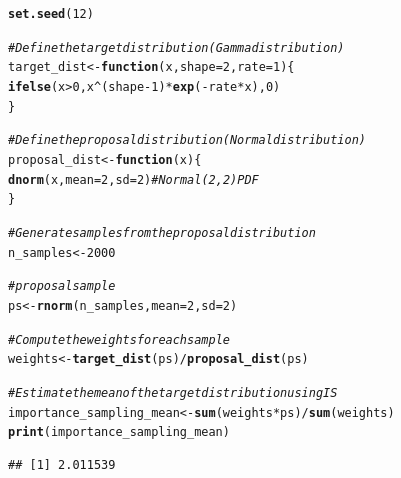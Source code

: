 \documentclass{article}\usepackage[]{graphicx}\usepackage[]{xcolor}
\makeatletter
\newcommand{\hlnum}[1]{\textcolor[rgb]{0.686,0.059,0.569}{#1}}%
\newcommand{\hlcom}[1]{\textcolor[rgb]{0.678,0.584,0.686}{\textit{#1}}}%
\newcommand{\hlopt}[1]{\textcolor[rgb]{0,0,0}{#1}}%
\newcommand{\hldef}[1]{\textcolor[rgb]{0.345,0.345,0.345}{#1}}%
\newcommand{\hlkwa}[1]{\textcolor[rgb]{0.161,0.373,0.58}{\textbf{#1}}}%
\newcommand{\hlkwb}[1]{\textcolor[rgb]{0.69,0.353,0.396}{#1}}%
\newcommand{\hlkwc}[1]{\textcolor[rgb]{0.333,0.667,0.333}{#1}}%
\newcommand{\hlkwd}[1]{\textcolor[rgb]{0.737,0.353,0.396}{\textbf{#1}}}%
\newenvironment{kframe}{%
 \def\at@end@of@kframe{}%
 \ifinner\ifhmode%
  \def\at@end@of@kframe{\end{minipage}}%
  \begin{minipage}{\columnwidth}%
 \fi\fi%
 \def\FrameCommand##1{\hskip\@totalleftmargin \hskip-\fboxsep
 \colorbox{shadecolor}{##1}\hskip-\fboxsep
     \hskip-\linewidth \hskip-\@totalleftmargin \hskip\columnwidth}%
 \MakeFramed {\advance\hsize-\width
   \@totalleftmargin\z@ \linewidth\hsize
   \@setminipage}}%
 {\par\unskip\endMakeFramed%
 \at@end@of@kframe}
\newenvironment{knitrout}{}{} %
\makeatother
\begin{document}
\begin{knitrout}
\color{fgcolor}\begin{kframe}
\begin{alltt}
\hlkwd{set.seed}\hldef{(}\hlnum{12}\hldef{)}

\hlcom{# Define the target distribution (Gamma distribution)}
\hldef{target_dist} \hlkwb{<-} \hlkwa{function}\hldef{(}\hlkwc{x}\hldef{,} \hlkwc{shape} \hldef{=} \hlnum{2}\hldef{,} \hlkwc{rate} \hldef{=} \hlnum{1}\hldef{) \{}
  \hlkwd{ifelse}\hldef{(x} \hlopt{>} \hlnum{0}\hldef{, x}\hlopt{^}\hldef{(shape} \hlopt{-} \hlnum{1}\hldef{)} \hlopt{*} \hlkwd{exp}\hldef{(}\hlopt{-}\hldef{rate} \hlopt{*} \hldef{x),} \hlnum{0}\hldef{)}
\hldef{\}}

\hlcom{# Define the proposal distribution (Normal distribution)}
\hldef{proposal_dist} \hlkwb{<-} \hlkwa{function}\hldef{(}\hlkwc{x}\hldef{) \{}
  \hlkwd{dnorm}\hldef{(x,} \hlkwc{mean} \hldef{=} \hlnum{2}\hldef{,} \hlkwc{sd} \hldef{=} \hlnum{2}\hldef{)}  \hlcom{# Normal(2, 2) PDF}
\hldef{\}}
\end{alltt}
\end{kframe}
\end{knitrout}

\begin{knitrout}
\color{fgcolor}\begin{kframe}
\begin{alltt}
\hlcom{# Generate samples from the proposal distribution }
\hldef{n_samples} \hlkwb{<-} \hlnum{2000}

\hlcom{# proposal sample}
\hldef{ps} \hlkwb{<-} \hlkwd{rnorm}\hldef{(n_samples,} \hlkwc{mean} \hldef{=} \hlnum{2}\hldef{,} \hlkwc{sd} \hldef{=} \hlnum{2}\hldef{)}

\hlcom{# Compute the weights for each sample}
\hldef{weights} \hlkwb{<-} \hlkwd{target_dist}\hldef{(ps)} \hlopt{/} \hlkwd{proposal_dist}\hldef{(ps)}

\hlcom{# Estimate the mean of the target distribution using IS}
\hldef{importance_sampling_mean} \hlkwb{<-} \hlkwd{sum}\hldef{(weights} \hlopt{*} \hldef{ps)} \hlopt{/} \hlkwd{sum}\hldef{(weights)}
\hlkwd{print}\hldef{(importance_sampling_mean)}
\end{alltt}
\begin{verbatim}
## [1] 2.011539
\end{verbatim}
\end{kframe}
\end{knitrout}
\end{document}
